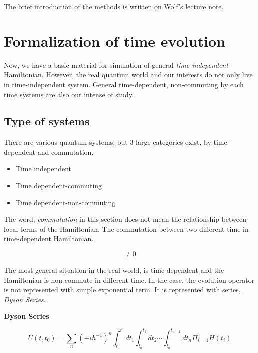 The brief introduction of the methods is written on Wolf's lecture note\cite{de2019quantum}.

\section{Formalization of time evolution}

Now, we have a basic material for 
simulation of general \textit{time-independent}
Hamiltonian. However, the real quantum world 
and our interests do not only live in time-independent system.
General time-dependent, non-commuting by each time systems are also 
our intense of study.

\subsection{Type of systems}

There are various quantum systems, but 3 large categories exist, by time-dependent and commutation.

\begin{itemize}
    \item Time independent
    \item Time dependent-commuting
    \item Time dependent-non-commuting
\end{itemize}

The word, \textit{commutation} in this section does not mean 
the relationship between local terms of the Hamiltonian.
The commutation between two different time in time-dependent Hamiltonian.

\begin{equation}
    [H(t_1), H(t_2) ] \neq 0  
\end{equation}


The most general situation in the real world, is time dependent and the Hamiltonian is non-commute 
in different time.
In the case, the evolution operator is not represented with simple
exponential term. It is represented with series, \textit{Dyson Series}.

\begin{theorem}\textbf{Dyson Series}
    
    \begin{equation*}
        U(t, t_0) = \sum_n (-i \hbar^{-1})^n \int_{t_0}^{t} dt_1 \int_{t_0}^{t_1} dt_2 \cdots \int_{t_0}^{t_{n-1}} dt_n \Pi_{i=1} H(t_i)
    \end{equation*}
\end{theorem}

